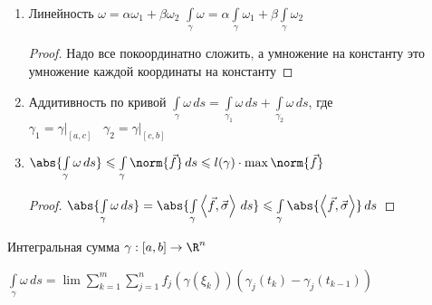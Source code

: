 \begin{properties}
\begin{enumerate}[1.]
\begin{proof}
			$= \int\limits_a^b \left\langle \vec{f}(\gamma(t)), \vec{\sigma}(\gamma(t)) \right\rangle \norm{\gamma'(t)}\,dt = \int\limits_{\gamma} \left\langle \vec{f}, \vec{\sigma} \right\rangle\,ds$
			
			$\vec{\sigma}(\gamma(t)) = \frac{\gamma'(t)}{\norm{\gamma'(t)}}$ (нам нужна касательная к кривой $\Rightarrow$ это производная, а затем надо его отнормировать)
		\end{proof}
		
		\item 
		Линейность $\omega = \alpha \omega_1 + \beta \omega_2$
		$\int\limits_\gamma \omega = \alpha\int\limits_\gamma \omega_1 + \beta\int\limits_\gamma \omega_2$
		\begin{proof}
			Надо все покоординатно сложить, а умножение на константу это умножение каждой координаты на константу
		\end{proof}
		
		\item
		Аддитивность по кривой $ \int\limits_{\gamma} \omega\,ds = \int\limits_{\gamma_1} \omega\,ds + \int\limits_{\gamma_2} \omega\,ds$, где $\gamma_1 = \gamma\Big|_{[a, c]}\;\;\;\gamma_2 = \gamma\Big|_{[c, b]}$
		
		\item
		$\abs{\int\limits_{\gamma} \omega\,ds} \leqslant \int\limits_{\gamma}\norm{\vec{f}}\,ds \leqslant l(\gamma) \cdot \max\norm{\vec{f}}$
		
		\begin{proof}\thmslashn
			
			$\abs{\int\limits_{\gamma} \omega\,ds} = \abs{\int\limits_{\gamma} \left\langle \vec{f}, \vec{\sigma} \right\rangle\,ds} \leqslant  \int\limits_{\gamma} \abs{\left\langle \vec{f}, \vec{\sigma} \right\rangle}\,ds$
			
		\end{proof}
		
	\end{enumerate}
	
\end{properties}

\begin{exerc}\thmslashn
	
	Интегральная сумма $\gamma:[a, b] \to \R^n$
	
	$\int\limits_{\gamma} \omega\,ds = \lim \sum\limits_{k=1}^m\sum\limits_{j=1}^n f_j(\gamma(\xi_k))(\gamma_j(t_k) - \gamma_j(t_{k-1}))$
	
\end{exerc}
